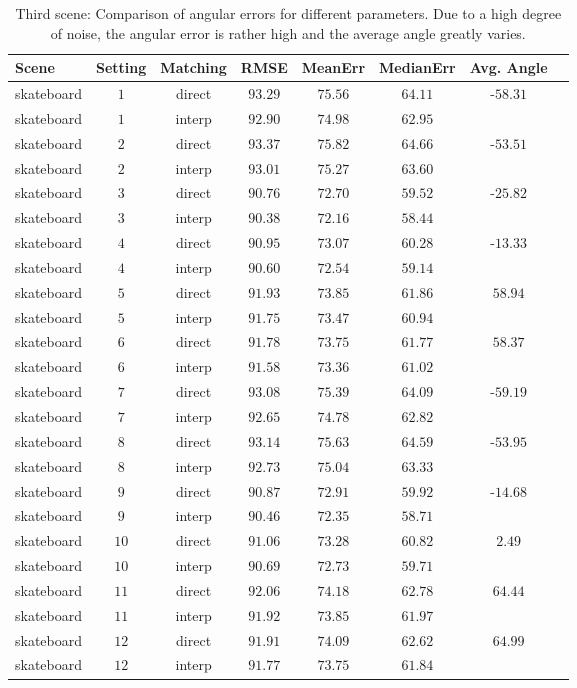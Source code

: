 \begin{table}[tb]
	\centering
		\begin{tabular}{lccccccc}
Scene & Setting & Matching & RMSE & MeanErr & MedianErr & Avg. Angle \\
\hline  \hline
skateboard & $1$ & direct & $93.29$ & $75.56$ & $64.11$ & -$58.31$ & \\
skateboard & $1$ & interp & $92.90$ & $74.98$ & $62.95$ &  & \\
skateboard & $2$ & direct & $93.37$ & $75.82$ & $64.66$ & -$53.51$ & \\
skateboard & $2$ & interp & $93.01$ & $75.27$ & $63.60$ &  & \\
skateboard & $3$ & direct & $90.76$ & $72.70$ & $59.52$ & -$25.82$ & \\
skateboard & $3$ & interp & $90.38$ & $72.16$ & $58.44$ &  & \\
skateboard & $4$ & direct & $90.95$ & $73.07$ & $60.28$ & -$13.33$ & \\
skateboard & $4$ & interp & $90.60$ & $72.54$ & $59.14$ &  & \\
skateboard & $5$ & direct & $91.93$ & $73.85$ & $61.86$ & $58.94$ & \\
skateboard & $5$ & interp & $91.75$ & $73.47$ & $60.94$ &  & \\
skateboard & $6$ & direct & $91.78$ & $73.75$ & $61.77$ & $58.37$ & \\
skateboard & $6$ & interp & $91.58$ & $73.36$ & $61.02$ &  & \\
skateboard & $7$ & direct & $93.08$ & $75.39$ & $64.09$ & -$59.19$ & \\
skateboard & $7$ & interp & $92.65$ & $74.78$ & $62.82$ &  & \\
skateboard & $8$ & direct & $93.14$ & $75.63$ & $64.59$ & -$53.95$ & \\
skateboard & $8$ & interp & $92.73$ & $75.04$ & $63.33$ &  & \\
skateboard & $9$ & direct & $90.87$ & $72.91$ & $59.92$ & -$14.68$ & \\
skateboard & $9$ & interp & $90.46$ & $72.35$ & $58.71$ &  & \\
skateboard & $10$ & direct & $91.06$ & $73.28$ & $60.82$ & $2.49$ & \\
skateboard & $10$ & interp & $90.69$ & $72.73$ & $59.71$ &  & \\
skateboard & $11$ & direct & $92.06$ & $74.18$ & $62.78$ & $64.44$ & \\
skateboard & $11$ & interp & $91.92$ & $73.85$ & $61.97$ &  & \\
skateboard & $12$ & direct & $91.91$ & $74.09$ & $62.62$ & $64.99$ & \\
skateboard & $12$ & interp & $91.77$ & $73.75$ & $61.84$ &  & \\
		\end{tabular}
	\caption[Third scene: Comparison of angular errors for different parameters.]{Third scene: Comparison of angular errors for different parameters. 
	Due to a high degree of noise, the angular error is rather high and the average angle greatly varies.}
	\label{tab:error_comparison_skateboard}
\end{table}



